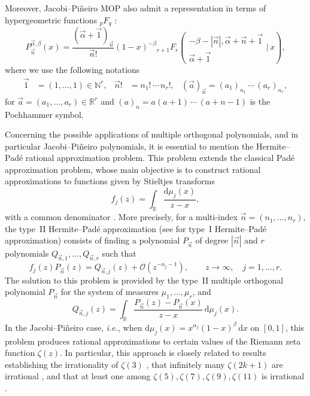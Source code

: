 \documentclass[11pt,reqno]{amsart}
\newcommand{\RR}{\mathbb{R}}
\theoremstyle{definition}
\begin{document}
Moreover, Jacobi--Piñeiro MOP also admit a representation in terms of hypergeometric functions ${}_p F_q$ \citep[Theorem 3.2]{BCVA05}:
\begin{equation}
    \label{eq:JP-hypergeometric}
    P_{\vec n}^{\vec\alpha,\beta}(x)=\dfrac{(\vec\alpha+\vec 1)_{\vec n}}{\vec n!}(1-x)^{-\beta}{}_{r+1}F_r\left(\begin{array}{c}
         -\beta-|\vec n|,\vec\alpha+\vec n+\vec 1 \\ \vec\alpha+\vec 1
    \end{array}\Bigg|\, x\right),
\end{equation}
where we use the following notations
\begin{align}
    \label{eq:notations-pochammer}
    \vec 1 &=(1,\dots,1)\in\mathbb N^r,& \vec n!& = n_1!\,\cdots\, n_r!,& (\vec a)_{\vec n}=(a_1)_{n_1}\,\cdots\,(a_r)_{n_r},
\end{align}
for $\vec a=(a_1,\dots,a_r)\in\RR^r$ and $(a)_n=a (a+1)\,\cdots\, (a+n-1)$ is the Pochhammer symbol.

Concerning the possible applications of multiple orthogonal polynomials, and in particular Jacobi--Piñeiro polynomials, it is essential to mention the Hermite--Padé rational approximation problem. This problem extends the classical Padé approximation problem, whose main objective is to construct rational approximations to functions given by Stieltjes transforms 
\begin{equation}
\label{eq:f_j}
f_j(z)=\displaystyle\int_\RR \dfrac{\mathrm d\mu_j(x)}{z-x},    
\end{equation}
with a common denominator \citep[Chapter 4]{NS91}. More precisely, for a multi-index $\vec n =(n_1,\dots,n_r)$, the type~II Hermite--Padé approximation (see \citep[Sections 2.1 and 2.2]{VA06} for type~I Hermite--Padé approximation) consists of finding a polynomial $P_{\vec n}$ of degree $|\vec n|$ and $r$ polynomials $Q_{\vec n,1},\dots,Q_{\vec n,r}$ such that
\begin{equation}
    \label{eq:H-P-univariate}
f_j(z)P_{\vec n}(z) = Q_{\vec n,j}(z)+\mathcal O(z^{-n_j-1}) , \qquad z\to\infty,\quad j=1,\dots,r.
\end{equation}
The solution to this problem is provided by the type~II multiple orthogonal polynomial $P_{\vec n}$ for the system of measures $\mu_1,\dots,\mu_r$, and
\begin{equation*}
Q_{\vec n,j}(z)=\displaystyle\int_\RR \dfrac{P_{\vec n}(z)-P_{\vec n}(x)}{z-x}\,\mathrm d\mu_j(x).
\end{equation*}
In the Jacobi--Piñeiro case, \textit{i.e.}, when $\mathrm d\mu_j(x)=x^{\alpha_j}(1-x)^\beta\,\mathrm dx$ on $[0,1]$, this problem produces rational approximations to certain values of the Riemann zeta function $\zeta(z)$. In particular, this approach is closely related to results establishing the irrationality of $\zeta(3)$ \citep{Ape79}, that infinitely many $\zeta(2k+1)$ are irrational \citep{BR01}, and that at least one among $\zeta(5),\zeta(7),\zeta(9),\zeta(11)$ is irrational \citep{Zud04}.
\end{document}
